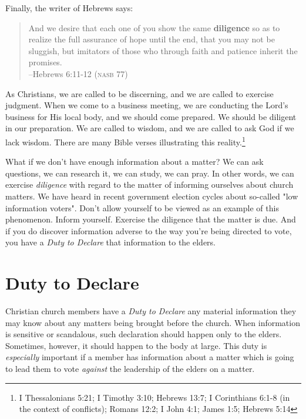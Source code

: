Finally, the writer of Hebrews says:
\begin{quote}
And we desire that each one of you show the same \textbf{diligence} so as to realize the full assurance of hope until the end, that you may not be sluggish, but imitators of those who through faith and patience inherit the promises.
\\ \hspace*{\fill} --Hebrews 6:11-12 (\textsc{nasb 77})
\end{quote}

As Christians, we are called to be discerning, and we are called to exercise judgment.  When we come to a business meeting, we are conducting the Lord's business for His local body, and we should come prepared.  We should be diligent in our preparation.  We are called to wisdom, and we are called to ask God if we lack wisdom.  There are many Bible verses illustrating this reality.\footnote{I Thessalonians 5:21; I Timothy 3:10; Hebrews 13:7; I Corinthians 6:1-8 (in the context of conflicts); Romans 12:2; I John 4:1; James 1:5; Hebrews 5:14}

What if we don't have enough information about a matter?  We can ask questions, we can research it, we can study, we can pray.  In other words, we can exercise \textit{diligence} with regard to the matter of informing ourselves about church matters.  We have heard in recent government election cycles about so-called "low information voters".  Don't allow yourself to be viewed as an example of this phenomenon.  Inform yourself.  Exercise the diligence that the matter is due.  And if you do discover information adverse to the way you're being directed to vote, you have a \textit{Duty to Declare} that information to the elders.

\ifdefined\embedversion\newpage\fi
\section{Duty to Declare}
Christian church members have a \textit{Duty to Declare} any material information they may know about any matters being brought before the church.  When information is sensitive or scandalous, such declaration should happen only to the elders.  Sometimes, however, it should happen to the body at large.  This duty is \textit{especially} important if a member has information about a matter which is going to lead them to vote \textit{against} the leadership of the elders on a matter.

